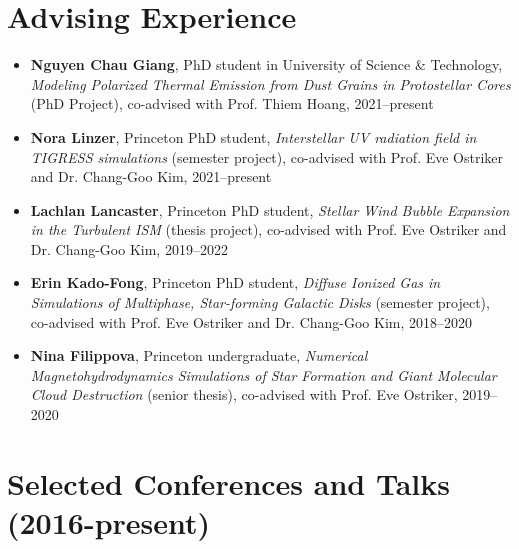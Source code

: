 \documentclass[11pt,letterpaper,roman]{moderncv}        %
\begin{document}
\section{Advising Experience}
\begin{itemize}
\setlength\itemsep{0.0em}
\item \textbf{Nguyen Chau Giang}, PhD student in University of Science \&
  Technology, \textit{Modeling Polarized Thermal Emission from Dust Grains in
    Protostellar Cores} (PhD Project), co-advised with Prof. Thiem Hoang,
  2021--present
\item \textbf{Nora Linzer}, Princeton PhD student, \textit{Interstellar UV
    radiation field in TIGRESS simulations} (semester project), co-advised with
  Prof. Eve Ostriker and Dr. Chang-Goo Kim, 2021--present
\item \textbf{Lachlan Lancaster}, Princeton PhD student, \textit{Stellar Wind
    Bubble Expansion in the Turbulent ISM} (thesis project), co-advised with
  Prof. Eve Ostriker and Dr. Chang-Goo Kim, 2019--2022
\item \textbf{Erin Kado-Fong}, Princeton PhD student, \textit{Diffuse Ionized Gas in
    Simulations of Multiphase, Star-forming Galactic Disks} (semester project),
  co-advised with Prof. Eve Ostriker and Dr. Chang-Goo Kim, 2018--2020
\item \textbf{Nina Filippova}, Princeton undergraduate, \textit{Numerical
    Magnetohydrodynamics Simulations of Star Formation and Giant Molecular Cloud
    Destruction} (senior thesis), co-advised with Prof. Eve Ostriker, 2019--2020
\end{itemize}




\section{Selected Conferences and Talks (2016-present)}
\end{document}
